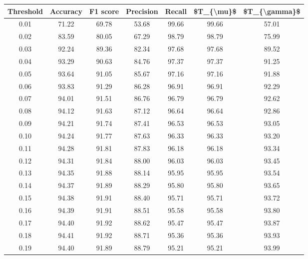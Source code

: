 \begin{tabular}{|c|c|c|c|c|c|c|}
\toprule
 Threshold &  Accuracy &  F1 score &  Precision &  Recall &  \$T\_\{\textbackslash mu\}\$ &  \$T\_\{\textbackslash gamma\}\$ \\
\hline
      0.01 &     71.22 &     69.78 &      53.68 &   99.66 &      99.66 &         57.01 \\
      0.02 &     83.59 &     80.05 &      67.29 &   98.79 &      98.79 &         75.99 \\
      0.03 &     92.24 &     89.36 &      82.34 &   97.68 &      97.68 &         89.52 \\
      0.04 &     93.29 &     90.63 &      84.76 &   97.37 &      97.37 &         91.25 \\
      0.05 &     93.64 &     91.05 &      85.67 &   97.16 &      97.16 &         91.88 \\
      0.06 &     93.83 &     91.29 &      86.28 &   96.91 &      96.91 &         92.29 \\
      0.07 &     94.01 &     91.51 &      86.76 &   96.79 &      96.79 &         92.62 \\
      0.08 &     94.12 &     91.63 &      87.12 &   96.64 &      96.64 &         92.86 \\
      0.09 &     94.21 &     91.74 &      87.41 &   96.53 &      96.53 &         93.05 \\
      0.10 &     94.24 &     91.77 &      87.63 &   96.33 &      96.33 &         93.20 \\
      0.11 &     94.28 &     91.81 &      87.83 &   96.18 &      96.18 &         93.34 \\
      0.12 &     94.31 &     91.84 &      88.00 &   96.03 &      96.03 &         93.45 \\
      0.13 &     94.35 &     91.88 &      88.14 &   95.95 &      95.95 &         93.54 \\
      0.14 &     94.37 &     91.89 &      88.29 &   95.80 &      95.80 &         93.65 \\
      0.15 &     94.38 &     91.91 &      88.40 &   95.71 &      95.71 &         93.72 \\
      0.16 &     94.39 &     91.91 &      88.51 &   95.58 &      95.58 &         93.80 \\
      0.17 &     94.40 &     91.92 &      88.62 &   95.47 &      95.47 &         93.87 \\
      0.18 &     94.41 &     91.92 &      88.71 &   95.36 &      95.36 &         93.93 \\
      0.19 &     94.40 &     91.89 &      88.79 &   95.21 &      95.21 &         93.99 \\

\end{tabular}
